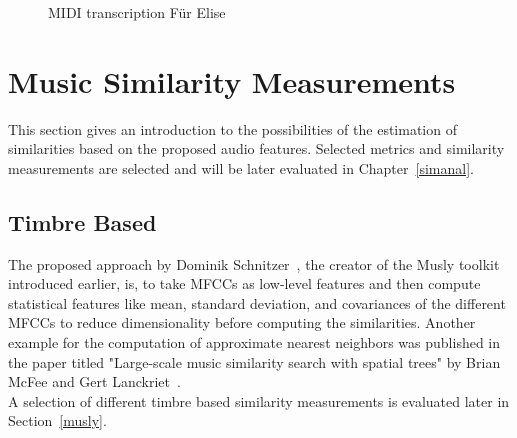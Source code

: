 \begin{figure}[htbp]
	\centering
	\caption{MIDI transcription Für Elise}
	\label{fig:transc}
\end{figure}
\FloatBarrier 

\section{Music Similarity Measurements}

This section gives an introduction to the possibilities of the estimation of similarities based on the proposed audio features. Selected metrics and similarity measurements are selected and will be later evaluated in Chapter~\ref{simanal}.

\subsection{Timbre Based}

The proposed approach by Dominik Schnitzer~\cite{schnitzer1}, the creator of the Musly toolkit introduced earlier, is, to take MFCCs as low-level features and then compute statistical features like mean, standard deviation, and covariances of the different MFCCs to reduce dimensionality before computing the similarities. Another example for the computation of approximate nearest neighbors was published in the paper titled "Large-scale music similarity search with spatial trees" by Brian McFee and Gert Lanckriet~\cite{msd4}.\\ 
A selection of different timbre based similarity measurements is evaluated later in Section~\ref{musly}.

